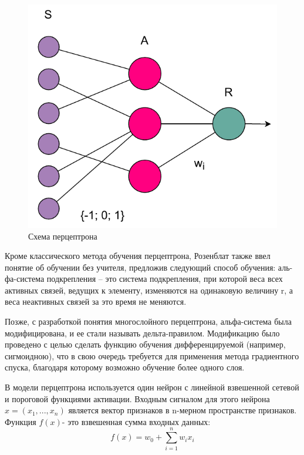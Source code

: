 \begin{figure}[hbtp]
	\centering
	\includegraphics[scale=1]{img/perc.pdf}
	\caption{Схема перцептрона}
	\label{fig:Simple_perceptron}
\end{figure} 	

Кроме классического метода обучения перцептрона, Розенблат также ввел понятие об обучении без учителя, предложив следующий способ обучения: аль- фа-система подкрепления -- это система подкрепления, при которой веса всех активных связей, ведущих к элементу, изменяются на одинаковую величину r, а веса неактивных связей за это время не меняются.

Позже, с разработкой понятия многослойного перцептрона, альфа-система была модифицирована, и ее стали называть дельта-правилом. Модификацию было проведено с целью сделать функцию обучения дифференцируемой (например, сигмоидною), что в свою очередь требуется для применения метода градиентного спуска, благодаря которому возможно обучение более одного слоя.

В модели перцептрона используется один нейрон с линейной взвешенной сетевой и пороговой функциями активации. Входным сигналом для этого нейрона $x=(x_1,...,x_n)$ является вектор признаков в n-мерном пространстве признаков. Функция $f(x)$- это взвешенная сумма входных данных:
\begin{equation}
	f(x)=w_0 + \sum_{i=1}^{n}w_ix_i
\end{equation}

